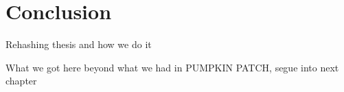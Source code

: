 \section{Conclusion}

Rehashing thesis and how we do it

What we got here beyond what we had in PUMPKIN PATCH, segue into next chapter
